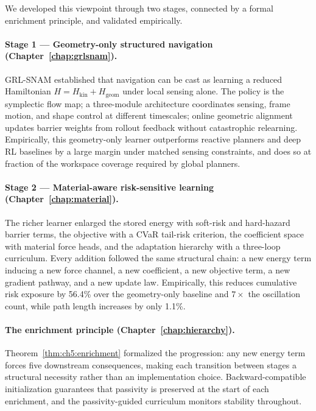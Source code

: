 We developed this viewpoint through two stages, connected by a
formal enrichment principle, and validated empirically.

\paragraph{Stage 1 — Geometry-only structured navigation (Chapter~\ref{chap:grlsnam}).}
GRL-SNAM established that navigation can be cast as learning a reduced
Hamiltonian $H = H_{\mathrm{kin}} + H_{\mathrm{geom}}$ under local
sensing alone.
The policy is the symplectic flow map; a three-module architecture
coordinates sensing, frame motion, and shape control at different
timescales; online geometric alignment updates barrier weights from
rollout feedback without catastrophic relearning.
Empirically, this geometry-only learner outperforms reactive planners
and deep RL baselines by a large margin under matched sensing
constraints, and does so at fraction of the workspace coverage
required by global planners.

\paragraph{Stage 2 — Material-aware risk-sensitive learning (Chapter~\ref{chap:material}).}
The richer learner enlarged the stored energy with soft-risk and
hard-hazard barrier terms, the objective with a CVaR tail-risk
criterion, the coefficient space with material force heads, and the
adaptation hierarchy with a three-loop curriculum.
Every addition followed the same structural chain: a new energy term
inducing a new force channel, a new coefficient, a new objective term,
a new gradient pathway, and a new update law.
Empirically, this reduces cumulative risk exposure by 56.4\% over the
geometry-only baseline and $7\times$ the oscillation count, while
path length increases by only 1.1\%.

\paragraph{The enrichment principle (Chapter~\ref{chap:hierarchy}).}
Theorem~\ref{thm:ch5:enrichment} formalized the progression:
any new energy term forces five downstream consequences, making each
transition between stages a structural necessity rather than an
implementation choice.
Backward-compatible initialization guarantees that passivity is
preserved at the start of each enrichment, and the passivity-guided
curriculum monitors stability throughout.

